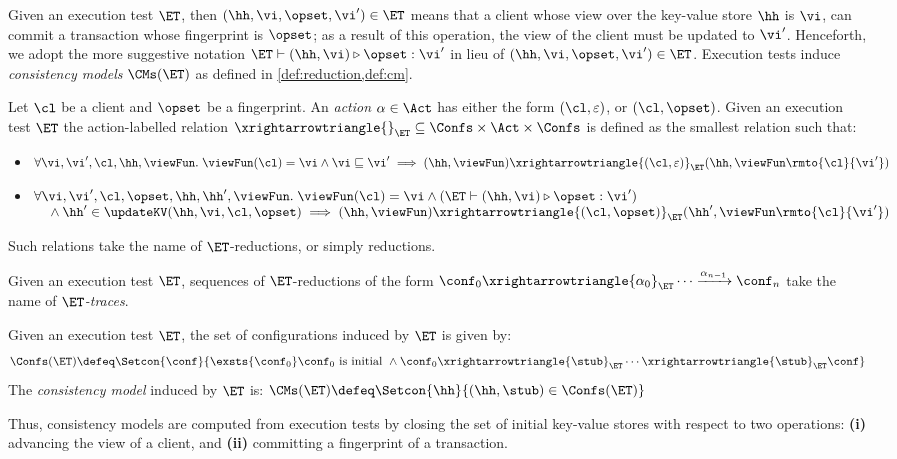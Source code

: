 Given an execution test $\ET$, 
then $(\hh, \vi, \opset, \vi') \in \ET$ means that 
a client whose view over the key-value store $\hh$ is $\vi$, 
can commit a transaction whose fingerprint is $\opset$;
as a result of this operation, the view of the client must be updated to $\vi'$.
Henceforth, we adopt the more suggestive notation $\ET \vdash (\hh, \vi) \triangleright \opset: \vi'$ 
in lieu of $(\hh, \vi, \opset, \vi') \in \ET$.
Execution tests induce \emph{consistency models} \( \CMs(\ET) \) as defined in \cref{def:reduction,def:cm}.
\begin{definition}[$\ET$-reductions]
\label{def:reduction}
Let $\cl$ be a client and $\opset$ be a fingerprint. 
An \emph{action} $\alpha \in \Act$ has either the form $(\cl, \varepsilon)$, 
or $(\cl, \opset)$. 
Given an execution test $\ET$ the action-labelled relation 
$\xrightarrowtriangle{}_{\ET} \subseteq \Confs \times \Act \times \Confs$ 
is defined as the smallest relation such that:
\begin{itemize}
\item 
    $\forall \vi, \vi', \cl, \hh, \viewFun.\; 
    \viewFun(\cl) = \vi 
    \wedge \vi \sqsubseteq \vi' 
    \implies (\hh, \viewFun) \xrightarrowtriangle{(\cl, \varepsilon)}_{\ET} 
    (\hh, \viewFun\rmto{\cl}{\vi'})$
\item 
    $\begin{array}[t]{@{}l@{}}
        \forall \vi, \vi', \cl, \opset, \hh, \hh', \viewFun.\; 
        \viewFun(\cl) = \vi
        \wedge (\ET \vdash (\hh, \vi) \triangleright \opset: \vi')  \\
        \quad {} \wedge \hh' \in \updateKV(\hh, \vi, \cl, \opset) 
        \implies (\hh, \viewFun) \xrightarrowtriangle{(\cl, \opset)}_{\ET} (\hh', \viewFun\rmto{\cl}{\vi'})
    \end{array}$
\end{itemize}
Such relations take the name of $\ET$-reductions, or simply reductions.
\end{definition}
Given an execution test $\ET$, sequences of $\ET$-reductions of the form $\conf_{0} \xrightarrowtriangle{\alpha_{0}}_{\ET} \cdots 
\xrightarrow{\alpha_{n-1}} \conf_{n}$ take the name of \emph{$\ET$-traces}.
\begin{definition}
\label{def:cm}
Given an execution test $\ET$, the set of configurations induced by $\ET$ is given by:
\[
\Confs(\ET) \defeq \Setcon{ \conf}{ \exsts{\conf_0} \conf_0 \text{ is initial } \wedge \conf_0 \xrightarrowtriangle{\stub}_{\ET} \cdots \xrightarrowtriangle{\stub}_{\ET} \conf }
\]
The \emph{consistency model} induced by $\ET$ is:
\( 
\CMs(\ET) \defeq \Setcon{ \hh }{ (\hh, \stub) \in \Confs(\ET) }
\)
\end{definition}
Thus, consistency models are computed from execution tests by closing the set of initial key-value stores with respect to two operations: 
\textbf{(i)} advancing the view of a client, 
and \textbf{(ii)} committing a fingerprint of a transaction. 

